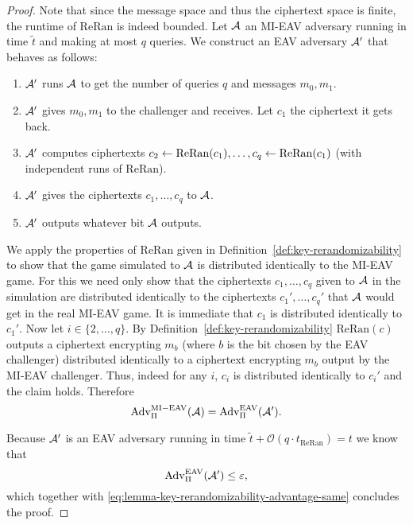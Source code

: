 \begin{proof}
	Note that since the message space and thus the ciphertext space is finite, the runtime of $\mathrm{ReRan}$ is indeed bounded. Let $\mathcal{A}$ an MI-EAV adversary running in time $\tilde{t}$ and making at most $q$ queries. We construct an EAV adversary $\mathcal{A}'$ that behaves as follows:
	\begin{enumerate}[1.]
		\item $\mathcal{A}'$ runs $\mathcal{A}$ to get the number of queries $q$ and messages $m_0, m_1$.
		\item $\mathcal{A}'$ gives $m_0, m_1$ to the challenger and receives. Let $c_1$ the ciphertext it gets back.
		\item $\mathcal{A}'$ computes ciphertexts $c_2 \leftarrow \mathrm{ReRan}(c_1), \ldots, c_q \leftarrow \mathrm{ReRan}(c_1)$ (with independent runs of $\mathrm{ReRan}$).
		\item $\mathcal{A}'$ gives the ciphertexts $c_1, \ldots, c_q$ to $\mathcal{A}$.
		\item $\mathcal{A}'$ outputs whatever bit $\mathcal{A}$ outputs.
	\end{enumerate}
	We apply the properties of $\mathrm{ReRan}$ given in Definition~\ref{def:key-rerandomizability} to show that the game simulated to $\mathcal{A}$ is distributed identically to the MI-EAV game. For this we need only show that the ciphertexts $c_1, \ldots, c_q$ given to $\mathcal{A}$ in the simulation are distributed identically to the ciphertexts $c_1', \ldots, c_q'$ that $\mathcal{A}$ would get in the real MI-EAV game. It is immediate that $c_1$ is distributed identically to $c_1'$. Now let $i \in \{2, \ldots, q\}$. By Definition~\ref{def:key-rerandomizability} $\mathrm{ReRan}(c)$ outputs a ciphertext encrypting $m_b$ (where $b$ is the bit chosen by the EAV challenger) distributed identically to a ciphertext encrypting $m_b$ output by the MI-EAV challenger. Thus, indeed for any $i$, $c_i$ is distributed identically to $c_i'$ and the claim holds. Therefore
	\begin{equation} \label{eq:lemma-key-rerandomizability-advantage-same}
		\mathrm{Adv}_{\Pi}^{\mathrm{MI-EAV}}(\mathcal{A}) = \mathrm{Adv}_{\Pi}^{\mathrm{EAV}}(\mathcal{A}').
	\end{equation}

	Because $\mathcal{A}'$ is an EAV adversary running in time $\tilde{t} + \mathcal{O}(q \cdot t_{\mathrm{ReRan}}) = t$ we know that
	\[
		\mathrm{Adv}_{\Pi}^{\mathrm{EAV}}(\mathcal{A}') \le \varepsilon,
	\]
	which together with \eqref{eq:lemma-key-rerandomizability-advantage-same} concludes the proof.
\end{proof}
